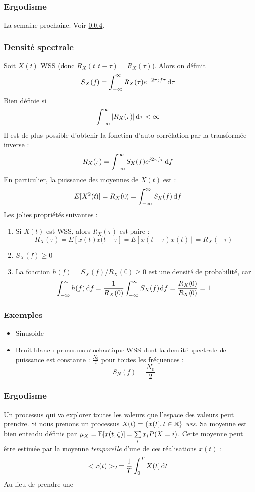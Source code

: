 \documentclass[11pt,a4paper]{article}
\numberwithin{equation}{section}
\begin{document}
\subsubsection{Ergodisme}
La semaine prochaine. Voir \ref{subsubsec:ergodisme}.
\subsubsection{Densité spectrale}
Soit $X(t)$ WSS (donc $R_X(t,t-\tau) = R_X(\tau)$). Alors on définit
\begin{equation}
    S_X(f) = \int_{-\infty}^{\infty} R_X(\tau) e^{-2\pi j f \tau} \, \mathrm d \tau
\end{equation}
Bien définie si
\[\int_{-\infty}^{\infty} |R_X(\tau)| \, \mathrm d \tau < \infty\]
Il est de plus possible d'obtenir la fonction d'auto-corrélation par la transformée inverse :
\begin{equation}
    R_X(\tau) = \int_{-\infty}^{\infty} S_X(f) e^{j2\pi f\tau}\, \mathrm d f
\end{equation}
En particulier, la puissance des moyennes de $X(t)$ est :
\begin{equation}
    E[X^2(t)] = R_X(0) = \int_{-\infty}^{\infty} S_X(f)\, \mathrm d f
\end{equation}
Les jolies propriétés suivantes :
\begin{enumerate}[label=P\arabic*.]
    \item Si $X(t)$ est WSS, alors $R_X(\tau)$ est paire :
    \[R_X(\tau) = E[x(t)x(t-\tau] = E[x(t-\tau)x(t)] = R_X(-\tau)\]
    \item $S_X(f) \geq 0$
    \item La fonction $h(f) = S_X(f)/R_X(0) \geq 0$ est une densité de probabilité, car
    \[\int_{-\infty}^{\infty} h(f)\, \mathrm d f = \frac{1}{R_X(0)}\int_{-\infty}^{\infty} S_X(f) \, \mathrm d f = \frac{R_X(0)}{R_X(0)} = 1\]
\end{enumerate}

\subsubsection{Exemples}
\begin{itemize}
    \item Sinusoide
    \item Bruit blanc : processus stochastique WSS dont la densité spectrale de puissance est constante : $\frac{N_0}{2}$ pour toutes les fréquences :
    \[S_N(f) = \frac{N_0}{2}\]
\end{itemize}

\subsubsection{Ergodisme}
\label{subsubsec:ergodisme}
Un processus qui va explorer toutes les valeurs que l'espace des valeurs peut prendre. Si nous prenons un processus $X(t) = \{x(t), t\in \mathbb{R}\}$ \textit{wss}. Sa moyenne est bien entendu définie par $\mu_X = \mathrm{E}[x(t,\zeta)] = \sum\limits_{i}^{} x_i P(X=i)$. Cette moyenne peut être estimée par la moyenne \textit{temporelle} d'une de ces réalisations $x(t)$ : 
\[< x(t) >_T = \frac{1}{T}\int_0^T X(t) \, \mathrm d t\]
Au lieu de prendre une 
\end{document}
